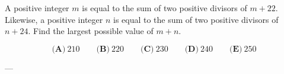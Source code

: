 A positive integer \(m\) is equal to the sum of two positive divisors of \(m+22\). Likewise, a positive integer \(n\) is equal to the sum of two positive divisors of \(n+24\). Find the largest possible value of \(m+n\).



\[
\textbf{(A)}\ 210
\qquad
\textbf{(B)}\ 220
\qquad
\textbf{(C)}\ 230
\qquad
\textbf{(D)}\ 240
\qquad
\textbf{(E)}\ 250
\]

---
